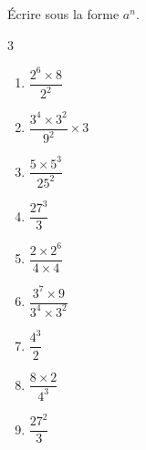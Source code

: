{%
\begin{Exercice}
Écrire sous la forme $a^n$.
\vspace{-0.5cm}
\begin{multicols}{3}
\begin{enumerate}[itemsep=1em]
	\item \begin{minipage}[t]{\linewidth}$\dfrac{2^6\times 8}{2^2}$\end{minipage}
	\item \begin{minipage}[t]{\linewidth}$\dfrac{3^4\times 3^2}{9^2}\times 3$\end{minipage}
	\item \begin{minipage}[t]{\linewidth}$\dfrac{5\times 5^3}{25^2}$\end{minipage}
	\item \begin{minipage}[t]{\linewidth}$\dfrac{27^3}{3}$\end{minipage}
	\item \begin{minipage}[t]{\linewidth}$\dfrac{2\times 2^6}{4\times 4}$\end{minipage}
	\item \begin{minipage}[t]{\linewidth}$\dfrac{3^7\times 9}{3^4 \times 3^2}$\end{minipage}
	\item \begin{minipage}[t]{\linewidth}$\dfrac{4^3}{2}$\end{minipage}
	\item \begin{minipage}[t]{\linewidth}$\dfrac{8\times 2}{4^3}$\end{minipage}
	\item \begin{minipage}[t]{\linewidth}$\dfrac{27^2}{3}$\end{minipage}
\end{enumerate}
\end{multicols}
\vspace{-0.5cm}
\end{Exercice}





}
